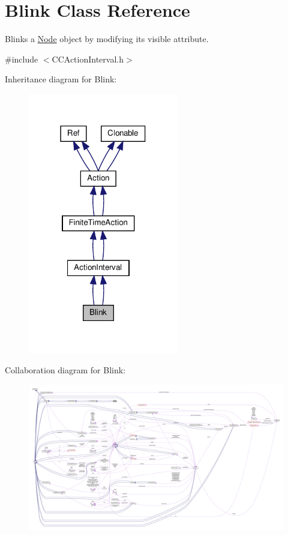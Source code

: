 \hypertarget{classBlink}{}\section{Blink Class Reference}
\label{classBlink}


Blinks a \hyperlink{classNode}{Node} object by modifying it\textquotesingle{}s visible attribute.  




{\ttfamily \#include $<$C\+C\+Action\+Interval.\+h$>$}



Inheritance diagram for Blink\+:
\nopagebreak
\begin{figure}[H]
\begin{center}
\leavevmode
\includegraphics[width=186pt]{classBlink__inherit__graph}
\end{center}
\end{figure}


Collaboration diagram for Blink\+:
\nopagebreak
\begin{figure}[H]
\begin{center}
\leavevmode
\includegraphics[width=350pt]{classBlink__coll__graph}
\end{center}
\end{figure}

